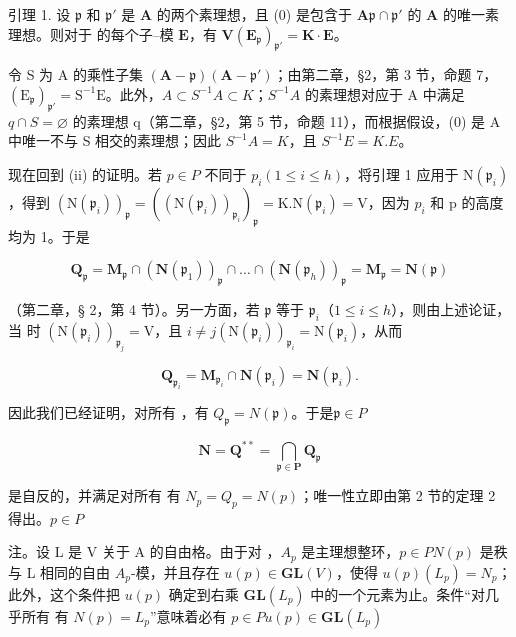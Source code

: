 引理 1. 设 \(\mathfrak{p}\) 和 \(\mathfrak{p}'\) 是 \(\mathbf{A}\) 的两个素理想，且 (0) 是包含于 \(\mathbf{A}\)\(\mathfrak{p} \cap \mathfrak{p}'\) 的 \(\mathbf{A}\) 的唯一素理想。则对于  的每个子--模 \(\mathbf{E}\)，有 \(\mathbf{V}\)\((\mathbf{E}_{\mathfrak{p}})_{\mathfrak{p}'} = \mathbf{K} \cdot \mathbf{E}\)。

令 S 为 A 的乘性子集 \((\mathbf{A}-\mathfrak{p})(\mathbf{A}-\mathfrak{p}')\)；由第二章，§2，第 3 节，命题 7，\((\mathrm{E}_{\mathfrak{p}})_{\mathfrak{p}'}=\mathrm{S}^{-1}\mathrm{E}\)。此外，\(A\subset S^{-1}A\subset K\)；\(S^{-1}A\) 的素理想对应于 A 中满足 \(q\cap S=\varnothing\) 的素理想 q（第二章，§2，第 5 节，命题 11），而根据假设，(0) 是 A 中唯一不与 S 相交的素理想；因此 \(S^{-1}A=K\)，且 \(S^{-1}E=K.E\)。

现在回到 (ii) 的证明。若 \(p \in P\) 不同于 \(p_i (1 \leqslant i \leqslant h)\)，将引理 1 应用于 \(\mathrm{N}(\mathfrak{p}_i)\)，得到 \((\mathrm{N}(\mathfrak{p}_i))_{\mathfrak{p}} = ((\mathrm{N}(\mathfrak{p}_i))_{\mathfrak{p}_i})_{\mathfrak{p}} = \mathrm{K}. \mathrm{N}(\mathfrak{p}_i) = \mathrm{V}\)，因为 \(p_i\) 和 p 的高度均为 1。于是

\[
\mathbf {Q} _ {\mathfrak {p}} = \mathbf {M} _ {\mathfrak {p}} \cap (\mathbf {N} (\mathfrak {p} _ {1})) _ {\mathfrak {p}} \cap \dots \cap (\mathbf {N} (\mathfrak {p} _ {h})) _ {\mathfrak {p}} = \mathbf {M} _ {\mathfrak {p}} = \mathbf {N} (\mathfrak {p})
\]

（第二章，§ 2，第 4 节）。另一方面，若 \(\mathfrak{p}\) 等于 \(\mathfrak{p}_i\)（\(1 \leqslant i \leqslant h\)），则由上述论证，当  时 \((\mathrm{N}(\mathfrak{p}_i))_{\mathfrak{p}_j} = \mathrm{V}\)，且 \(i \neq j\)\((\mathrm{N}(\mathfrak{p}_i))_{\mathfrak{p}_i} = \mathrm{N}(\mathfrak{p}_i)\)，从而

\[
\mathbf {Q} _ {\mathfrak {p} _ {i}} = \mathbf {M} _ {\mathfrak {p} _ {i}} \cap \mathbf {N} (\mathfrak {p} _ {i}) = \mathbf {N} (\mathfrak {p} _ {i}).
\]

因此我们已经证明，对所有 ，有 \(Q_{\mathfrak{p}} = N(\mathfrak{p})\)。于是\(\mathfrak{p} \in P\)

\[
\mathbf {N} = \mathbf {Q} ^ {* *} = \bigcap_ {\mathfrak {p} \in \mathbf {P}} \mathbf {Q} _ {\mathfrak {p}}
\]

是自反的，并满足对所有  有 \(N_{p} = Q_{p} = N(p)\)；唯一性立即由第 2 节的定理 2 得出。\(p \in P\)

注。设 L 是 V 关于 A 的自由格。由于对 ，\(A_{p}\) 是主理想整环，\(p \in P\)\(N(p)\) 是秩与 L 相同的自由 \(A_{p}\)-模，并且存在 \(u(p) \in \mathbf{GL}(V)\)，使得 \(u(p)(L_{p}) = N_{p}\)；此外，这个条件把 \(u(p)\) 确定到右乘 \(\mathbf{GL}(L_{p})\) 中的一个元素为止。条件“对几乎所有  有 \(N(p) = L_{p}\)”意味着必有 \(p \in P\)\(u(p) \in \mathbf{GL}(L_{p})\)

